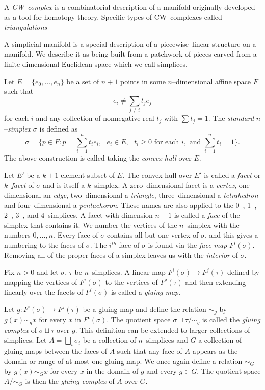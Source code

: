A \emph{CW--complex} is a combinatorial description of a manifold originally developed as a tool for homotopy theory.
Specific types of CW--complexes called \emph{triangulations}


A simplicial manifold is a special description of a piecewise--linear structure on a manifold.
We describe it as being built from a patchwork of pieces carved from a finite dimensional Euclidean space which we call simplices.

Let $E=\{e_0,\dots,e_n\}$ be a set of $n+1$ points in some $n$--dimensional affine space $F$ such that
\[
  e_i\neq \sum_{j\neq i}t_j e_j
\]
for each $i$ and any collection of nonnegative real $t_j$ with $\sum t_j=1$.
The \emph{standard} $n$--\emph{simplex} $\sigma$ is defined as
\[
  \sigma = \{p\in F : p = \sum_{i=1}^n t_i e_i,\text{ } e_i\in E,\text{ } t_i\geq 0\text{ for each }i, \text{ and }\sum_{i=1}^n t_i=1\}.
\]
The above construction is called taking the \emph{convex hull} over $E$.

Let $E'$ be a $k+1$ element subset of $E$.
The convex hull over $E'$ is called a \emph{facet} or \emph{$k$--facet} of $\sigma$ and is itself a $k$--simplex.
A zero--dimensional facet is a \emph{vertex}, one--dimensional an \emph{edge}, two--dimensional a \emph{triangle}, three--dimensional a \emph{tetrahedron} and four--dimensional a \emph{pentachoron}.
These names are also applied to the 0--, 1--, 2--, 3--, and 4--simplices.
A facet with dimension $n-1$ is called a \emph{face} of the simplex that contains it.
We number the vertices of the $n$--simplex with the numbers $0,\dots,n$.
Every face of $\sigma$ contains all but one vertex of $\sigma$, and this gives a numbering to the faces of $\sigma$.
The $i^{th}$ face of $\sigma$ is found via the \emph{face map} $F^i(\sigma)$.
Removing all of the proper faces of a simplex leaves us with the \emph{interior} of $\sigma$.

Fix $n>0$ and let $\sigma$, $\tau$ be $n$--simplices.
A linear map $F^i(\sigma)\to F^j(\tau)$ defined by mapping the vertices of $F^i(\sigma)$ to the vertices of $F^j(\tau)$ and then extending linearly over the facets of $F^i(\sigma)$ is called a \emph{gluing map}.

Let $g:F^i(\sigma)\to F^j(\tau)$ be a gluing map and define the relation $\sim_g$ by $g(x)\sim_g x$ for every $x$ in $F^i(\sigma)$.
The quotient space $\sigma\sqcup\tau/\sim_g$ is called the \emph{gluing complex} of $\sigma\sqcup\tau$ over $g$.
This definition can be extended to larger collections of simplices.
Let $A=\bigsqcup_i\sigma_i$ be a collection of $n$--simplices and $G$ a collection of gluing maps between the faces of $A$ such that any face of $A$ appears as the domain or range of at most one gluing map.
We once again define a relation $\sim_G$ by $g(x)\sim_G x$ for every $x$ in the domain of $g$ and every $g\in G$. 
The quotient space $A/\sim_G$ is then the \emph{gluing complex} of $A$ over $G$.

